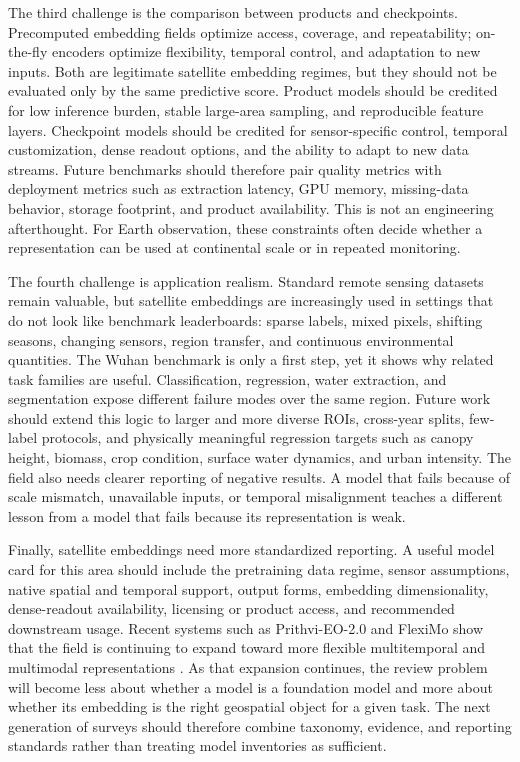The third challenge is the comparison between products and checkpoints. Precomputed embedding fields optimize access, coverage, and repeatability; on-the-fly encoders optimize flexibility, temporal control, and adaptation to new inputs. Both are legitimate satellite embedding regimes, but they should not be evaluated only by the same predictive score. Product models should be credited for low inference burden, stable large-area sampling, and reproducible feature layers. Checkpoint models should be credited for sensor-specific control, temporal customization, dense readout options, and the ability to adapt to new data streams. Future benchmarks should therefore pair quality metrics with deployment metrics such as extraction latency, GPU memory, missing-data behavior, storage footprint, and product availability. This is not an engineering afterthought. For Earth observation, these constraints often decide whether a representation can be used at continental scale or in repeated monitoring.

The fourth challenge is application realism. Standard remote sensing datasets remain valuable, but satellite embeddings are increasingly used in settings that do not look like benchmark leaderboards: sparse labels, mixed pixels, shifting seasons, changing sensors, region transfer, and continuous environmental quantities. The Wuhan benchmark is only a first step, yet it shows why related task families are useful. Classification, regression, water extraction, and segmentation expose different failure modes over the same region. Future work should extend this logic to larger and more diverse ROIs, cross-year splits, few-label protocols, and physically meaningful regression targets such as canopy height, biomass, crop condition, surface water dynamics, and urban intensity. The field also needs clearer reporting of negative results. A model that fails because of scale mismatch, unavailable inputs, or temporal misalignment teaches a different lesson from a model that fails because its representation is weak.

Finally, satellite embeddings need more standardized reporting. A useful model card for this area should include the pretraining data regime, sensor assumptions, native spatial and temporal support, output forms, embedding dimensionality, dense-readout availability, licensing or product access, and recommended downstream usage. Recent systems such as Prithvi-EO-2.0 and FlexiMo show that the field is continuing to expand toward more flexible multitemporal and multimodal representations \citep{prithvieo2_tgrs,fleximo_tgrs}. As that expansion continues, the review problem will become less about whether a model is a foundation model and more about whether its embedding is the right geospatial object for a given task. The next generation of surveys should therefore combine taxonomy, evidence, and reporting standards rather than treating model inventories as sufficient.

